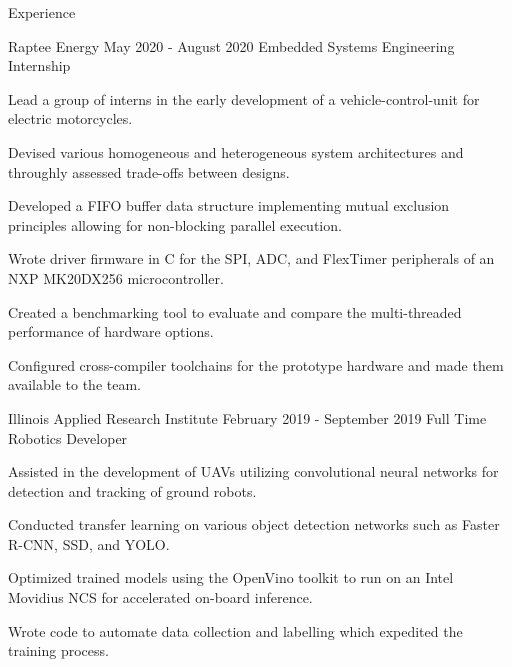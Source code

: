 \documentclass{resume} %
\begin{document}
    \begin{rSection}{Experience}

		\begin{rSubsection}{Raptee Energy} {May 2020 - August 2020} {Embedded Systems Engineering Internship}

			\item Lead a group of interns in the early development of a vehicle-control-unit for electric motorcycles.
			\item Devised various homogeneous and heterogeneous system architectures and throughly assessed trade-offs between designs.
			\item Developed a FIFO buffer data structure implementing mutual exclusion principles allowing for non-blocking parallel execution.
			\item Wrote driver firmware in C for the SPI, ADC, and FlexTimer peripherals of an NXP MK20DX256 microcontroller.
			\item Created a benchmarking tool to evaluate and compare the multi-threaded performance of hardware options.
			\item Configured cross-compiler toolchains for the prototype hardware and made them available to the team.

		\end{rSubsection}

        \begin{rSubsection}{Illinois Applied Research Institute} {February 2019 - September 2019} {Full Time Robotics Developer}

            \item Assisted in the development of UAVs utilizing convolutional neural networks for detection and tracking of ground robots.
            \item Conducted transfer learning on various object detection networks such as Faster R-CNN, SSD, and YOLO.
            \item Optimized trained models using the OpenVino toolkit to run on an Intel Movidius NCS for accelerated on-board inference.
            \item Wrote code to automate data collection and labelling which expedited the training process.

        \end{rSubsection}

    \end{rSection}

\end{document}
